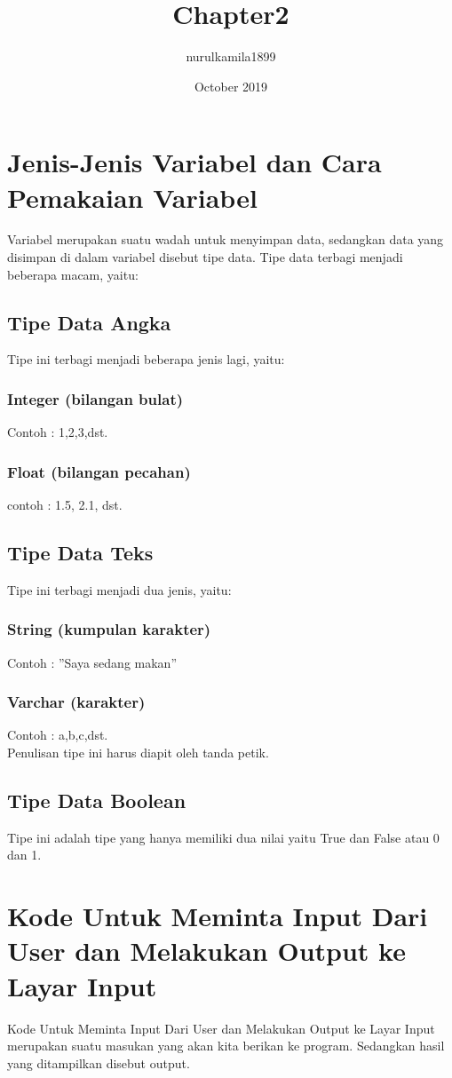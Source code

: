 \documentclass{article}
\title{Chapter2}
\author{nurulkamila1899 }
\date{October 2019}
\begin{document}
\maketitle

\section{Jenis-Jenis Variabel dan Cara Pemakaian Variabel}
Variabel merupakan suatu wadah untuk menyimpan data, sedangkan data yang disimpan di dalam variabel disebut tipe data. Tipe data terbagi menjadi beberapa macam, yaitu:
\subsection{Tipe Data Angka}
Tipe ini terbagi menjadi beberapa jenis lagi, yaitu:
\subsubsection{Integer (bilangan bulat)}
Contoh : 1,2,3,dst.
\subsubsection{Float (bilangan pecahan)}
contoh : 1.5, 2.1, dst.
\subsection{Tipe Data Teks}
Tipe ini terbagi menjadi dua jenis, yaitu:
\subsubsection{String (kumpulan karakter)}
Contoh : ”Saya sedang makan”
\subsubsection{Varchar (karakter)}
Contoh : a,b,c,dst.\\
Penulisan tipe ini harus diapit oleh tanda petik.
\subsection{Tipe Data Boolean}
Tipe ini adalah tipe yang hanya memiliki dua nilai yaitu True dan False atau 0 dan 1.
\section{Kode Untuk Meminta Input Dari User dan Melakukan Output ke Layar Input }
Kode Untuk Meminta Input Dari User dan Melakukan Output ke Layar
Input merupakan suatu masukan yang akan kita berikan ke program. Sedangkan hasil yang ditampilkan disebut output.
\end{document}
